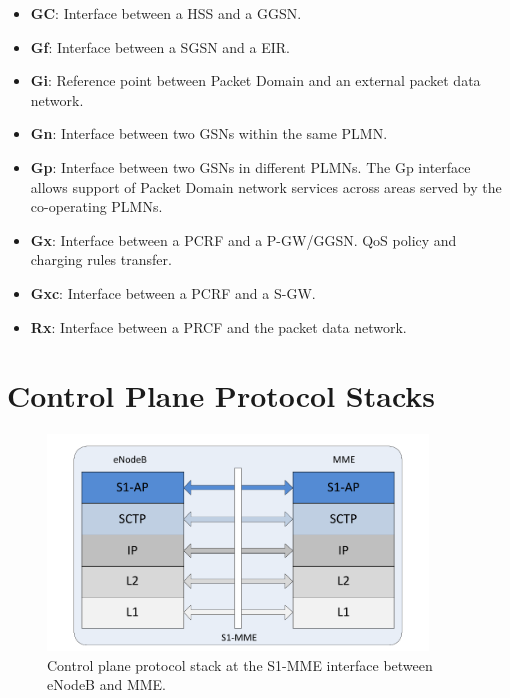 \begin{itemize}
\item \textbf{GC}: Interface between a HSS and a GGSN.
\item \textbf{Gf}: Interface between a SGSN and a EIR.
\item \textbf{Gi}: Reference point between Packet Domain and an external packet data network.
\item \textbf{Gn}: Interface between two GSNs within the same PLMN.
\item \textbf{Gp}: Interface between two GSNs in different PLMNs. The Gp interface allows support of Packet Domain network services across areas served by the co-operating PLMNs.
\item \textbf{Gx}: Interface between a PCRF and a P-GW/GGSN. QoS policy and charging rules transfer.
\item \textbf{Gxc}: Interface between a PCRF and a S-GW.

\item \textbf{Rx}: Interface between a PRCF and the packet data network.
\end{itemize}

\section{Control Plane Protocol Stacks}

\begin{figure}[htbp]
	\centering
 	\includegraphics[width=0.9\textwidth]{images/eNB-MME-layers.pdf}
 	\caption{Control plane protocol stack at the S1-MME interface between eNodeB and MME.}
 	\label{c4:fig:stack-enbmme}
\end{figure}

